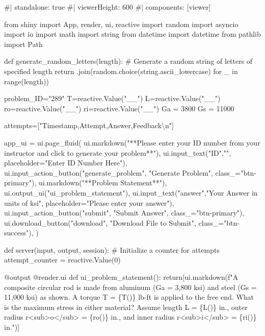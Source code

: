 \documentclass[
  letterpaper,
  DIV=11,
  numbers=noendperiod]{scrreprt}
\newenvironment{Shaded}{\begin{snugshade}}{\end{snugshade}}
\newcommand{\NormalTok}[1]{\textcolor[rgb]{0.00,0.23,0.31}{#1}}
\begin{document}
\begin{Shaded}
\begin{Highlighting}[]
\NormalTok{\#| standalone: true}
\NormalTok{\#| viewerHeight: 600}
\NormalTok{\#| components: [viewer]}

\NormalTok{from shiny import App, render, ui, reactive}
\NormalTok{import random}
\NormalTok{import asyncio}
\NormalTok{import io}
\NormalTok{import math}
\NormalTok{import string}
\NormalTok{from datetime import datetime}
\NormalTok{from pathlib import Path}

\NormalTok{def generate\_random\_letters(length):}
\NormalTok{    \# Generate a random string of letters of specified length}
\NormalTok{    return \textquotesingle{}\textquotesingle{}.join(random.choice(string.ascii\_lowercase) for \_ in range(length)) }

\NormalTok{problem\_ID="289"}
\NormalTok{T=reactive.Value("\_\_")}
\NormalTok{L=reactive.Value("\_\_")}
\NormalTok{ro=reactive.Value("\_\_")}
\NormalTok{ri=reactive.Value("\_\_")}
\NormalTok{Ga = 3800}
\NormalTok{Gs = 11000}

\NormalTok{attempts=["Timestamp,Attempt,Answer,Feedback\textbackslash{}n"]}

\NormalTok{app\_ui = ui.page\_fluid(}
\NormalTok{    ui.markdown("**Please enter your ID number from your instructor and click to generate your problem**"),}
\NormalTok{    ui.input\_text("ID","", placeholder="Enter ID Number Here"),}
\NormalTok{    ui.input\_action\_button("generate\_problem", "Generate Problem", class\_="btn{-}primary"),}
\NormalTok{    ui.markdown("**Problem Statement**"),}
\NormalTok{    ui.output\_ui("ui\_problem\_statement"),}
\NormalTok{    ui.input\_text("answer","Your Answer in units of ksi", placeholder="Please enter your answer"),}
\NormalTok{    ui.input\_action\_button("submit", "Submit Answer", class\_="btn{-}primary"),}
\NormalTok{    ui.download\_button("download", "Download File to Submit", class\_="btn{-}success"),}
\NormalTok{)}


\NormalTok{def server(input, output, session):}
\NormalTok{    \# Initialize a counter for attempts}
\NormalTok{    attempt\_counter = reactive.Value(0)}

\NormalTok{    @output}
\NormalTok{    @render.ui}
\NormalTok{    def ui\_problem\_statement():}
\NormalTok{        return[ui.markdown(f"A composite circular rod is made from aluminum (Ga = 3,800 ksi) and steel (Gs = 11,000 ksi) as shown. A torque T = \{T()\} lb{-}ft is applied to the free end. What is the maximum stress in either material? Assume length L = \{L()\} in., outer radius r\textless{}sub\textgreater{}o\textless{}/sub\textgreater{} = \{ro()\} in., and inner radius r\textless{}sub\textgreater{}i\textless{}/sub\textgreater{} = \{ri()\} in.")]}
    

\end{Highlighting}
\end{Shaded}
\end{document}
